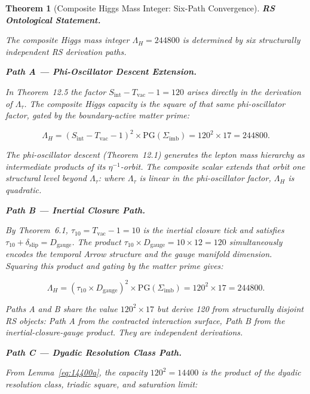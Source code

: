 \documentclass[11pt, letterpaper]{article}
\newcommand{\Sinter}{S_{\mathrm{int}}}
\theoremstyle{definition}
\theoremstyle{plain}
\newtheorem{theorem}{Theorem}[section]
\begin{document}
\begin{theorem}[Composite Higgs Mass Integer: Six-Path Convergence]

\textbf{RS Ontological Statement.}

The composite Higgs mass integer $\Lambda_H = 244800$ is determined by six structurally
independent RS derivation paths.

\medskip
\noindent\textbf{Path A — Phi-Oscillator Descent Extension.}

In Theorem~12.5 the factor $\Sinter - T_\mathrm{vac} - 1 = 120$ arises directly in the
derivation of $\Lambda_\tau$. The composite Higgs capacity is the square of that same
phi-oscillator factor, gated by the boundary-active matter prime:

\begin{equation}
    \Lambda_H = (\Sinter - T_\mathrm{vac} - 1)^2 \times \mathrm{PG}(\Sigma_\mathrm{imb})
              = 120^2 \times 17 = 244800.
\end{equation}

The phi-oscillator descent (Theorem~12.1) generates the lepton mass hierarchy as
intermediate products of its $\eta^{-1}$-orbit. The composite scalar extends that orbit
one structural level beyond $\Lambda_\tau$: where $\Lambda_\tau$ is linear in the
phi-oscillator factor, $\Lambda_H$ is quadratic.

\medskip
\noindent\textbf{Path B — Inertial Closure Path.}

By Theorem~6.1, $\tau_{10} = T_\mathrm{vac} - 1 = 10$ is the inertial closure tick and
satisfies $\tau_{10} + \delta_\mathrm{slip} = D_\mathrm{gauge}$. The product
$\tau_{10} \times D_\mathrm{gauge} = 10 \times 12 = 120$ simultaneously encodes the
temporal Arrow structure and the gauge manifold dimension. Squaring this product and
gating by the matter prime gives:

\begin{equation}
    \Lambda_H = (\tau_{10} \times D_\mathrm{gauge})^2 \times \mathrm{PG}(\Sigma_\mathrm{imb})
              = 120^2 \times 17 = 244800.
\end{equation}

Paths A and B share the value $120^2 \times 17$ but derive 120 from structurally
disjoint RS objects: Path A from the contracted interaction surface, Path B from the
inertial-closure-gauge product. They are independent derivations.

\medskip
\noindent\textbf{Path C — Dyadic Resolution Class Path.}

From Lemma~\ref{eq:14400a}, the capacity $120^2 = 14400$ is the product of the dyadic
resolution class, triadic square, and saturation limit:


\end{theorem}
\end{document}
